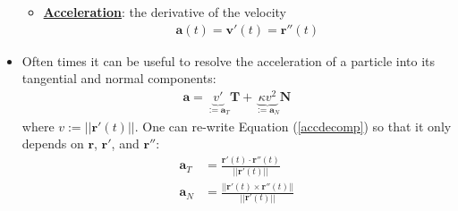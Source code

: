 \documentclass[11pt]{article}
\newcommand{\dfn}[1]{\underline{\textbf{#1}}}
\begin{document}
\begin{itemize}[noitemsep]
\begin{itemize}
		\item \dfn{Acceleration}: the derivative of the velocity
		\begin{align}
			\mathbf{a}(t) = \mathbf{v'}(t) = \mathbf{r}''(t) 	
		\end{align}
	\end{itemize}
	\item Often times it can be useful to resolve the acceleration of a particle into its tangential and normal components: 
	\begin{align}\label{accdecomp}
		\mathbf{a} = \underbrace{v'}_{:= \mathbf{a}_T}  \mathbf{T} + \underbrace{ \kappa v^2}_{:= \mathbf{a}_N}	\mathbf{N}
	\end{align}
	where $v := || \mathbf{r}'(t) ||$. One can re-write Equation (\ref{accdecomp}) so that it only depends on $\mathbf{r}$, $\mathbf{r}'$, and $\mathbf{r}''$: 
	\begin{align}
		\mathbf{a}_T & = \frac{\mathbf{r}'(t) \cdot \mathbf{r}''(t)}{|| \mathbf{r}'(t) ||}	\\
		\mathbf{a}_N & = \frac{|| \mathbf{r}'(t) \times \mathbf{r}''(t) || }{|| \mathbf{r}'(t) ||}
	\end{align}
\end{itemize}
\end{document}
